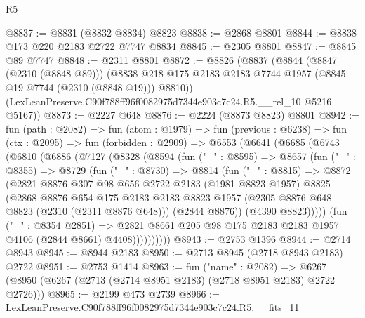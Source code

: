 \begin{lexlean}{R5}
\begin{coremodule}
@8837 := @8831 (@8832 @8834) @8823
@8838 := @2868 @8801
@8844 := @8838 @173 @220 @2183 @2722 @7747 @8834
@8845 := @2305 @8801
@8847 := @8845 @89 @7747
@8848 := @2311 @8801
@8872 := @8826
    (@8837
      (@8844
        (@8847 (@2310 (@8848 @89)))
        (@8838 @218 @175 @2183 @2183 @7744 @1957 (@8845 @19 @7744 (@2310 (@8848 @19))) @8810))
      (LexLeanPreserve.C90f788ff96f0082975d7344e903c7c24.R5.__rel_10 @5216 @5167))
@8873 := @2227 @648
@8876 := @2224 (@8873 @8823) @8801
@8942 := fun (path : @2082) =>
  fun (atom : @1979) =>
  fun (previous : @6238) =>
  fun (ctx : @2095) =>
  fun (forbidden : @2909) =>
  @6553
    (@6641
      (@6685
        (@6743
          (@6810
            (@6886
              (@7127
                (@8328
                  (@8594
                    (fun ("_" : @8595) =>
                    @8657
                      (fun ("_" : @8355) =>
                      @8729
                        (fun ("_" : @8730) =>
                        @8814
                          (fun ("_" : @8815) =>
                          @8872
                            (@2821
                              @8876
                              @307
                              @98
                              @656
                              @2722
                              @2183
                              (@1981 @8823 @1957)
                              @8825
                              (@2868
                                @8876
                                @654
                                @175
                                @2183
                                @2183
                                @8823
                                @1957
                                (@2305 @8876 @648 @8823 (@2310 (@2311 @8876 @648)))
                                (@2844 @8876))
                              (@4390 @8823)))))
                      (fun ("_" : @8354 @2851) =>
                      @2821
                        @8661
                        @205
                        @98
                        @175
                        @2183
                        @2183
                        @1957
                        @4106
                        (@2844 @8661)
                        @4408))))))))))
@8943 := @2753 @1396
@8944 := @2714 @8943
@8945 := @8944 @2183
@8950 := @2713 @8945 (@2718 @8943 @2183) @2722
@8951 := @2753 @1414
@8963 := fun ("name" : @2082) =>
  @6267 (@8950 (@6267 (@2713 (@2714 @8951 @2183) (@2718 @8951 @2183) @2722 @2726)))
@8965 := @2199 @473 @2739
@8966 := LexLeanPreserve.C90f788ff96f0082975d7344e903c7c24.R5.__fits_11

\end{coremodule}
\end{lexlean}

